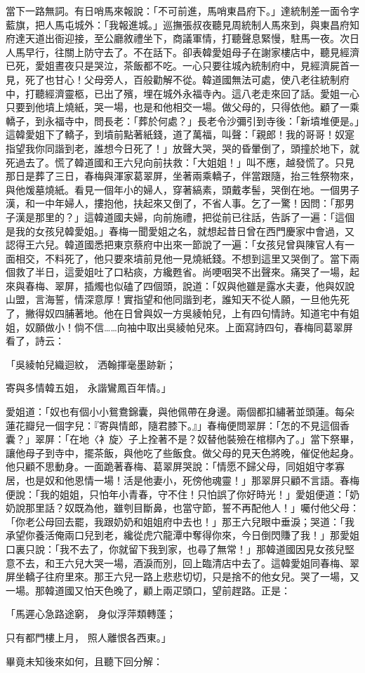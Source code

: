 \begin{showcontents}{}
當下一路無詞。有日哨馬來報說：「不可前進，馬哨東昌府下。」達統制差一面令字藍旗，把人馬屯城外：「我報進城。」巡撫張叔夜聽見周統制人馬來到，與東昌府知府達天道出衙迎接，至公廳敘禮坐下，商議軍情，打聽聲息緊慢，駐馬一夜。次日人馬早行，往關上防守去了。不在話下。卻表韓愛姐母子在謝家樓店中，聽見經濟已死，愛姐晝夜只是哭泣，茶飯都不吃。一心只要往城內統制府中，見經濟屍首一見，死了也甘心！父母旁人，百般勸解不從。韓道國無法可處，使八老往統制府中，打聽經濟靈柩，已出了殯，埋在城外永福寺內。這八老走來回了話。愛姐一心只要到他墳上燒紙，哭一場，也是和他相交一場。做父母的，只得依他。顧了一乘轎子，到永福寺中，問長老：「葬於何處？」長老令沙彌引到寺後：「新墳堆便是。」這韓愛姐下了轎子，到墳前點著紙錢，道了萬福，叫聲：「親郎！我的哥哥！奴寔指望我你同諧到老，誰想今日死了！」放聲大哭，哭的昏暈倒了，頭撞於地下，就死過去了。慌了韓道國和王六兒向前扶救：「大姐姐！」叫不應，越發慌了。只見那日是葬了三日，春梅與渾家葛翠屏，坐著兩乘轎子，伴當跟隨，抬三牲祭物來，與他煖墓燒紙。看見一個年小的婦人，穿著縞素，頭戴孝髻，哭倒在地。一個男子漢，和一中年婦人，摟抱他，扶起來又倒了，不省人事。乞了一驚！因問：「那男子漢是那里的？」這韓道國夫婦，向前施禮，把從前已往話，告訴了一遍：「這個是我的女孩兒韓愛姐。」春梅一聞愛姐之名，就想起昔日曾在西門慶家中會過，又認得王六兒。韓道國悉把東京蔡府中出來一節說了一遍：「女孩兒曾與陳官人有一面相交，不料死了，他只要來墳前見他一見燒紙錢。不想到這里又哭倒了。當下兩個救了半日，這愛姐吐了口粘痰，方纔甦省。尚哽咽哭不出聲來。痛哭了一場，起來與春梅、翠屏，插燭也似磕了四個頭，說道：「奴與他雖是露水夫妻，他與奴說山盟，言海誓，情深意厚！實指望和他同諧到老，誰知天不從人願，一旦他先死了，撇得奴四脯著地。他在日曾與奴一方吳綾帕兒，上有四句情詩。知道宅中有姐姐，奴願做小！倘不信……向袖中取出吳綾帕兒來。上面寫詩四句，春梅同葛翠屏看了，詩云：

「吳綾帕兒織迴紋，  洒翰揮毫墨跡新；

寄與多情韓五姐，  永諧鸞鳳百年情。」

愛姐道：「奴也有個小小鴛鴦錦囊，與他佩帶在身邊。兩個都扣繡著並頭蓮。每朵蓮花瓣兒一個字兒：『寄與情郎，隨君膝下。』」春梅便問翠屏：「怎的不見這個香囊？」翠屏：「在地〈衤旋〉子上拴著不是？奴替他裝殮在棺槨內了。」當下祭畢，讓他母子到寺中，擺茶飯，與他吃了些飯食。做父母的見天色將晚，催促他起身。他只顧不思動身。一面跪著春梅、葛翠屏哭說：「情愿不歸父母，同姐姐守孝寡居，也是奴和他恩情一場！活是他妻小，死傍他魂靈！」那翠屏只顧不言語。春梅便說：「我的姐姐，只怕年小青春，守不住！只怕誤了你好時光！」愛姐便道：「奶奶說那里話？奴既為他，雖刳目斷鼻，也當守節，誓不再配他人！」囑付他父母：「你老公母回去罷，我跟奶奶和姐姐府中去也！」那王六兒眼中垂淚；哭道：「我承望你養活俺兩口兒到老，纔從虎穴龍潭中奪得你來，今日倒閃賺了我！」那愛姐口裏只說：「我不去了，你就留下我到家，也尋了無常！」那韓道國因見女孩兒堅意不去，和王六兒大哭一場，酒淚而別，回上臨清店中去了。這韓愛姐同春梅、翠屏坐轎子往府里來。那王六兒一路上悲悲切切，只是捨不的他女兒。哭了一場，又一場。那韓道國又怕天色晚了，顧上兩疋頭口，望前趕路。正是：

「馬遲心急路途窮，  身似浮萍類轉蓬；

只有都門樓上月，  照人離恨各西東。」

畢竟未知後來如何，且聽下回分解：





\end{showcontents}


